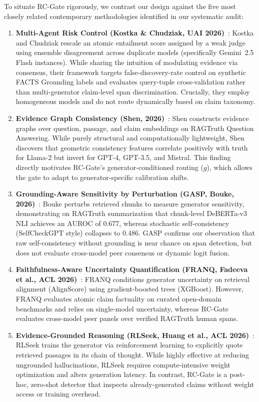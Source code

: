 \documentclass[pdflatex,sn-mathphys,Numbered]{sn-jnl}
\begin{document}
To situate RC-Gate rigorously, we contrast our design against the five most closely related contemporary methodologies identified in our systematic audit:
\begin{enumerate}
    \item \textbf{Multi-Agent Risk Control (Kostka \& Chudziak, UAI 2026)}~\cite{kostka2026uncertainty}: Kostka and Chudziak rescale an atomic entailment score assigned by a weak judge using ensemble disagreement across duplicate models (specifically Gemini~2.5 Flash instances). While sharing the intuition of modulating evidence via consensus, their framework targets false-discovery-rate control on synthetic FACTS Grounding labels and evaluates query-tuple cross-validation rather than multi-generator claim-level span discrimination. Crucially, they employ homogeneous models and do not route dynamically based on claim taxonomy.
    \item \textbf{Evidence Graph Consistency (Shen, 2026)}~\cite{shen2026egc}: Shen constructs evidence graphs over question, passage, and claim embeddings on RAGTruth Question Answering. While purely structural and computationally lightweight, Shen discovers that geometric consistency features correlate positively with truth for Llama-2 but invert for GPT-4, GPT-3.5, and Mistral. This finding directly motivates RC-Gate's generator-conditioned routing ($g$), which allows the gate to adapt to generator-specific calibration shifts.
    \item \textbf{Grounding-Aware Sensitivity by Perturbation (GASP, Bouke, 2026)}~\cite{bouke2026gasp}: Bouke perturbs retrieved chunks to measure generator sensitivity, demonstrating on RAGTruth summarization that chunk-level DeBERTa-v3 NLI achieves an AUROC of 0.677, whereas stochastic self-consistency (SelfCheckGPT style) collapses to 0.486. GASP confirms our observation that raw self-consistency without grounding is near chance on span detection, but does not evaluate cross-model peer consensus or dynamic logit fusion.
    \item \textbf{Faithfulness-Aware Uncertainty Quantification (FRANQ, Fadeeva et al., ACL 2026)}~\cite{fadeeva2026franq}: FRANQ conditions generator uncertainty on retrieval alignment (AlignScore) using gradient-boosted trees (XGBoost). However, FRANQ evaluates atomic claim factuality on curated open-domain benchmarks and relies on single-model uncertainty, whereas RC-Gate evaluates cross-model peer panels over verified RAGTruth human spans.
    \item \textbf{Evidence-Grounded Reasoning (RLSeek, Huang et al., ACL 2026)}~\cite{huang2026rlseek}: RLSeek trains the generator via reinforcement learning to explicitly quote retrieved passages in its chain of thought. While highly effective at reducing ungrounded hallucinations, RLSeek requires compute-intensive weight optimization and alters generation latency. In contrast, RC-Gate is a post-hoc, zero-shot detector that inspects already-generated claims without weight access or training overhead.
\end{enumerate}
\end{document}
